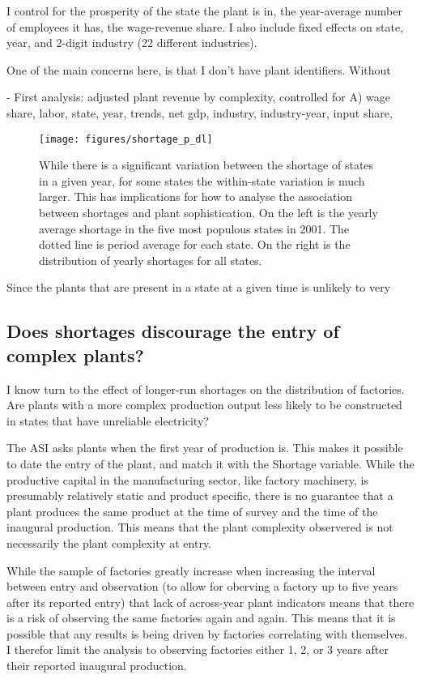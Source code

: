\documentclass[11pt]{article}
\begin{document}
I control for the prosperity of the state the plant is in, the year-average number of employees it has, the wage-revenue share. I also include fixed effects on state, year, and 2-digit industry (22 different industries).

One of the main concerns here, is that I don't have plant identifiers. Without 

- First analysis: adjusted plant revenue by complexity, controlled for A) wage share, labor, state, year, trends, net gdp, industry, industry-year, input share,




\begin{figure}[htpb]
	\centering
	\texttt{[image: figures/shortage\_p\_dl]}
	\caption{While there is a significant variation between the shortage of states in a given year, for some states the within-state variation is much larger. This has implications for how to analyse the association between shortages and plant sophistication. On the left is the yearly average shortage in the five most populous states in 2001. The dotted line is period average for each state. On the right is the distribution of yearly shortages for all states.}%
	\label{fig:shortage_dist}
\end{figure}

Since the plants that are present in a state at a given time is unlikely to very

\subsection{Does shortages discourage the entry of complex plants?}%
\label{sub:longterm}

I know turn to the effect of longer-run shortages on the distribution of factories. Are plants with a more complex production output less likely to be constructed in states that have unreliable electricity? 

The ASI asks plants when the first year of production is. This makes it possible to date the entry of the plant, and match it with the Shortage variable. While the productive capital in the manufacturing sector, like factory machinery, is presumably relatively static and product specific, there is no guarantee that a plant produces the same product at the time of survey and the time of the inaugural production. This means that the plant complexity observered is not necessarily the plant complexity at entry.

While the sample of factories greatly increase when increasing the interval between entry and observation (to allow for oberving a factory up to five years after its reported entry) that lack of across-year plant indicators means that there is a risk of observing the same factories again and again. This means that it is possible that any results is being driven by factories correlating with themselves. I therefor limit the analysis to observing factories either 1, 2, or 3 years after their reported inaugural production. 
\end{document}
